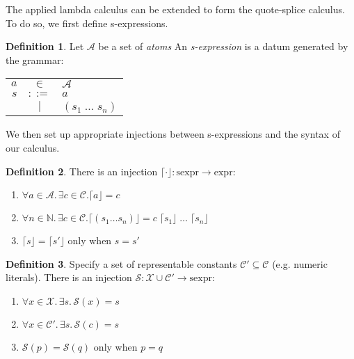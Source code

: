 \documentclass[11pt]{article} %
\theoremstyle{definition}
\newtheorem{definition}{Definition}
\theoremstyle{remark}
\begin{document}
The applied lambda calculus can be extended to form the quote-splice calculus.
To do so, we first define s-expressions.

\begin{definition}
Let $\mathcal A$ be a set of \emph{atoms}
An \emph{s-expression} is a datum generated by the grammar:
\begin{center}
\begin{tabular}{rcl}
$a$ & $\in$ & $\mathcal A$ \\
$s$ & $::=$ & $a$ \\
  & $\mid$ & $(s_1\;\ldots\;s_n)$ \\
\end{tabular}
\end{center}
\end{definition}

We then set up appropriate injections between s-expressions and the syntax of our calculus.

\begin{definition}
There is an injection $\lceil \cdot \rfloor : \mathrm{sexpr} \to \mathrm{expr}$:
\begin{enumerate}
\item $\forall a \in \mathcal A.\, \exists c \in \mathcal C.
  \lceil a \rfloor = c$
\item $\forall n \in \mathbb N.\, \exists c \in \mathcal C.
  \lceil (s_1 \ldots s_n) \rfloor = c\;\lceil s_1 \rfloor\;\ldots\;\lceil s_n \rfloor$
\item $\lceil s \rfloor = \lceil s' \rfloor$ only when $s = s'$
\end{enumerate}
\end{definition}

\begin{definition}
Specify a set of representable constants $\mathcal C' \subseteq \mathcal C$ (e.g. numeric literals).
There is an injection $\mathcal S : \mathcal X \cup \mathcal C' \to \mathrm{sexpr}$:
\begin{enumerate}
\item $\forall x \in \mathcal X.\, \exists s.\,
  \mathcal S(x) = s$
\item $\forall x \in \mathcal C'.\, \exists s.\,
  \mathcal S(c) = s$
\item $\mathcal S(p) = \mathcal S(q)$ only when $p = q$
\end{enumerate}
\end{definition}
\end{document}
